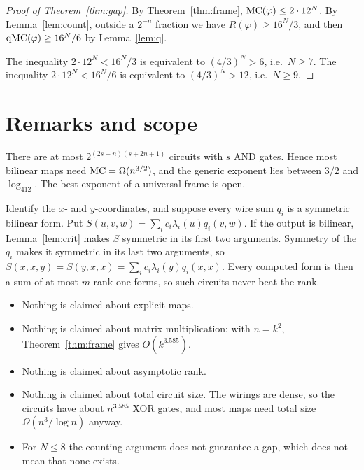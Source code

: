 \begin{proof}[Proof of Theorem~\ref{thm:gap}]
By Theorem~\ref{thm:frame}, $\operatorname{MC}(\varphi)\le2\cdot12^N$. By Lemma~\ref{lem:count}, outside a $2^{-n}$ fraction we have $R(\varphi)\ge16^N/3$, and then $\operatorname{qMC}(\varphi)\ge16^N/6$ by Lemma~\ref{lem:q}.

The inequality $2\cdot12^N<16^N/3$ is equivalent to $(4/3)^N>6$, i.e.\ $N\ge7$. The inequality $2\cdot12^N<16^N/6$ is equivalent to $(4/3)^N>12$, i.e.\ $N\ge9$.
\end{proof}

\section{Remarks and scope}

\begin{remark}
There are at most $2^{(2s+n)(s+2n+1)}$ circuits with $s$ AND gates. Hence most bilinear maps need $\operatorname{MC}=\Omega(n^{3/2})$, and the generic exponent lies between $3/2$ and $\log_412$. The best exponent of a universal frame is open.
\end{remark}

\begin{remark}
Identify the $x$- and $y$-coordinates, and suppose every wire sum $q_i$ is a symmetric bilinear form. Put $S(u,v,w)=\sum_ic_i\lambda_i(u)q_i(v,w)$. If the output is bilinear, Lemma~\ref{lem:crit} makes $S$ symmetric in its first two arguments. Symmetry of the $q_i$ makes it symmetric in its last two arguments, so $S(x,x,y)=S(y,x,x)=\sum_ic_i\lambda_i(y)q_i(x,x)$. Every computed form is then a sum of at most $m$ rank-one forms, so such circuits never beat the rank.
\end{remark}

\begin{remark}
\begin{itemize}
\item Nothing is claimed about explicit maps.
\item Nothing is claimed about matrix multiplication: with $n=k^2$, Theorem~\ref{thm:frame} gives $O(k^{3.585})$.
\item Nothing is claimed about asymptotic rank.
\item Nothing is claimed about total circuit size. The wirings are dense, so the circuits have about $n^{3.585}$ XOR gates, and most maps need total size $\Omega(n^3/\log n)$ anyway.
\item For $N\le8$ the counting argument does not guarantee a gap, which does not mean that none exists.
\end{itemize}
\end{remark}

